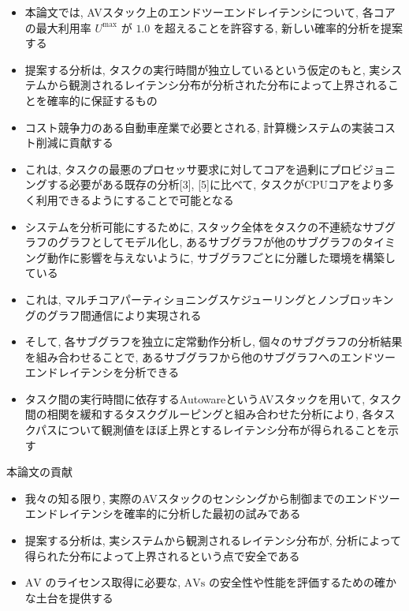 \begin{frame}{}
    \begin{itemize}
        \item 本論文では, AVスタック上のエンドツーエンドレイテンシについて, 各コアの最大利用率 $U^{\max }$ が $1.0$ を超えることを許容する, 新しい確率的分析を提案する
        \item 提案する分析は, タスクの実行時間が独立しているという仮定のもと, 実システムから観測されるレイテンシ分布が分析された分布によって上界されることを確率的に保証するもの
        \item コスト競争力のある自動車産業で必要とされる, 計算機システムの実装コスト削減に貢献する
        \item これは, タスクの最悪のプロセッサ要求に対してコアを過剰にプロビジョニングする必要がある既存の分析[3], [5]に比べて, タスクがCPUコアをより多く利用できるようにすることで可能となる
    \end{itemize}
\end{frame}

\begin{frame}{}
    \begin{itemize}
        \item システムを分析可能にするために, スタック全体をタスクの不連続なサブグラフのグラフとしてモデル化し, あるサブグラフが他のサブグラフのタイミング動作に影響を与えないように, サブグラフごとに分離した環境を構築している
        \item これは, マルチコアパーティショニングスケジューリングとノンブロッキングのグラフ間通信により実現される
        \item そして, 各サブグラフを独立に定常動作分析し, 個々のサブグラフの分析結果を組み合わせることで, あるサブグラフから他のサブグラフへのエンドツーエンドレイテンシを分析できる
        \item タスク間の実行時間に依存するAutowareというAVスタックを用いて, タスク間の相関を緩和するタスクグルーピングと組み合わせた分析により, 各タスクパスについて観測値をほぼ上界とするレイテンシ分布が得られることを示す
    \end{itemize}
\end{frame}

\begin{frame}{本論文の貢献}
    \begin{itemize}
        \item  我々の知る限り, 実際のAVスタックのセンシングから制御までのエンドツーエンドレイテンシを確率的に分析した最初の試みである

        \item  提案する分析は, 実システムから観測されるレイテンシ分布が, 分析によって得られた分布によって上界されるという点で安全である

        \item  $\mathrm{AV}$ のライセンス取得に必要な, $\mathrm{AVs}$ の安全性や性能を評価するための確かな土台を提供する

    \end{itemize}
\end{frame}
